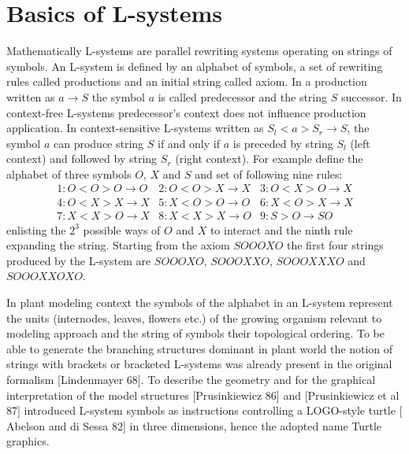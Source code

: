 \section{Basics of L-systems}

Mathematically L-systems  are parallel rewriting  systems operating on
strings of symbols. An L-system  is defined by an alphabet of symbols,
a  set of  rewriting rules  called productions  and an  initial string
called axiom. In a production  written as $a \rightarrow S$ the symbol
$a$  is   called  predecessor  and  the  string   $S$  successor.   In
context-free  L-systems  predecessor's   context  does  not  influence
production  application.  In  context-sensitive  L-systems written  as
$S_l < a  > S_r \rightarrow S$, the symbol $a$  can produce string $S$
if and  only if  $a$ is  preceded by string  $S_l$ (left  context) and
followed  by string  $S_r$ (right  context).  For  example  define the
alphabet of three  symbols $O$, $X$ and $S$ and  set of following nine
rules:
\begin{equation}\label{eq:ca110}
\begin{array}{lll}
1:O < O > O \rightarrow O & 2:O < O > X \rightarrow X &
3:O < X > O \rightarrow X \\ 
4:O < X > X \rightarrow X & 5:X < O > O \rightarrow O&
6:X < O > X \rightarrow X \\
7:X < X > O \rightarrow X & 8:X < X > X \rightarrow O & 
9:S > O \rightarrow SO
\end{array}
\end{equation}
enlisting the $2^3$  possible ways of $O$ and $X$  to interact and the
ninth rule expanding the string.  Starting from the axiom $SOOOXO$ the
first four  strings produced by the L-system  are $SOOOXO$, $SOOOXXO$,
\linebreak $SOOOXXXO$ and $SOOOXXOXO$.

In plant modeling  context the symbols of the  alphabet in an L-system
represent the units (internodes, leaves, flowers etc.)  of the growing
organism relevant to modeling approach and the string of symbols their
topological ordering.  To be able to generate the branching structures
dominant  in  plant world  the  notion  of  strings with  brackets  or
bracketed  L-systems was  already  present in  the original  formalism
[Lindenmayer  68]. To  describe  the geometry  and  for the  graphical
interpretation  of   the  model  structures   [Prusinkiewicz  86]  and
[Prusinkiewicz et  al 87] introduced L-system  symbols as instructions
controlling a  LOGO-style turtle [ Abelson  and di Sessa  82] in three
dimensions, hence the adopted name Turtle graphics.

